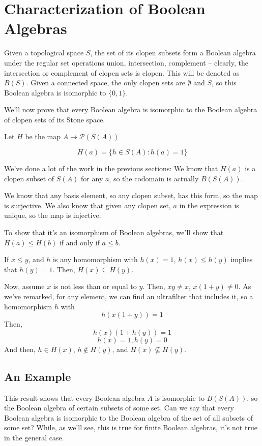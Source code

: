 \documentclass{article}
\begin{document}
    \section{Characterization of Boolean Algebras}

      Given a topological space $S$, the set of its clopen subsets form a
      Boolean algebra under the regular set operations union, intersection,
      complement -- clearly, the intersection or complement of clopen sets is
      clopen. This will be denoted as $B(S)$. Given a connected space, the only
      clopen sets are $\emptyset$ and $S$, so this Boolean algebra is isomorphic
      to $\{0,1\}$.

      We'll now prove that every Boolean algebra is isomorphic to the Boolean
      algebra of clopen sets of its Stone space.

      Let $H$ be the map $A \rightarrow \mathcal{P}(S(A))$

      \[H(a) = \{h \in S(A) : h(a) = 1\}\]

      We've done a lot of the work in the previous sections: We know that $H(a)$
      is a clopen subset of $S(A)$ for any $a$, so the codomain is actually
      $B(S(A))$.

      We know that any basis element, so any clopen subset, has this form, so
      the map is surjective.  We also know that given any clopen set, $a$ in the
      expression is unique, so the map is injective.

      To show that it's an isomorphism of Boolean algebras, we'll show that
      $H(a) \leq H(b)$ if and only if $a \leq b$.

      If $x \leq y$, and $h$ is any homomorphism with $h(x) = 1$, $h(x) \leq
      h(y)$ implies that $h(y) = 1$. Then, $H(x) \subseteq H(y)$.

      Now, assume $x$ is not less than or equal to $y$. Then, $xy \neq x$,
      $x(1+y) \neq 0$.  As we've remarked, for any element, we can find an
      ultrafilter that includes it, so a homomorphism $h$ with \[h(x(1+y)) = 1\]
      Then, \[h(x)(1+h(y)) = 1\] \[h(x) = 1, h(y) = 0\] And then, $h \in H(x)$,
      $h \notin  H(y)$, and $H(x) \nsubseteq H(y)$.

      \subsection{An Example}

        This result shows that every Boolean algebra $A$ is isomorphic to $B(S(A))$, so
        the Boolean algebra of certain subsets of some set. Can we say that
        every Boolean algebra is isomorphic to the Boolean algebra of the set of
        all subsets of some set? While, as we'll see, this is true for finite
        Boolean algebras, it's not true in the general case.
\end{document}
